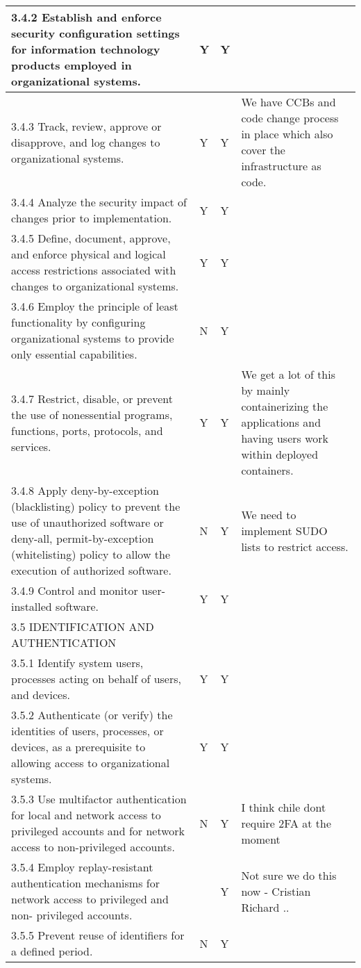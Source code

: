 \begin{longtable} {|p{}|p{}|p{}|p{} |}
{3.4.2 Establish and enforce security configuration settings for information technology products employed in organizational systems.}&{Y}&{Y}& \\ \hline
{3.4.3 Track, review, approve or disapprove, and log changes to organizational systems.}&{Y}&{Y}&{We have CCBs and code change process in place which also cover the infrastructure as code. } \\ \hline
{3.4.4 Analyze the security impact of changes prior to implementation.}&{Y}&{Y}& \\ \hline
{3.4.5 Define, document, approve, and enforce physical and logical access restrictions associated with changes to organizational systems.}&{Y}&{Y}& \\ \hline
{3.4.6 Employ the principle of least functionality by configuring organizational systems to provide only essential capabilities.}&{N}&{Y}& \\ \hline
{3.4.7 Restrict, disable, or prevent the use of nonessential programs, functions, ports, protocols, and services.}&{Y}&{Y}&{We get a lot of this by mainly containerizing the applications and having users work within deployed containers.} \\ \hline
{3.4.8 Apply deny-by-exception (blacklisting) policy to prevent the use of unauthorized software or deny-all, permit-by-exception (whitelisting) policy to allow the execution of authorized software.}&{N}&{Y}&{We need to implement SUDO lists to restrict access.} \\ \hline
{3.4.9 Control and monitor user-installed software.}&{Y}&{Y}& \\ \hline
{3.5 IDENTIFICATION AND AUTHENTICATION}&&& \\ \hline
{3.5.1 Identify system users, processes acting on behalf of users, and devices.}&{Y}&{Y}& \\ \hline
{3.5.2 Authenticate (or verify) the identities of users, processes, or devices, as a prerequisite to allowing access to organizational systems.}&{Y}&{Y}& \\ \hline
{3.5.3 Use multifactor authentication for local and network access to privileged accounts and for network access to non-privileged accounts.}&{N}&{Y}&{ I think chile dont require 2FA at the moment} \\ \hline
{3.5.4 Employ replay-resistant authentication mechanisms for network access to privileged and non- privileged accounts.}&{}&{Y}&{Not sure we do this now - Cristian Richard ..} \\ \hline
{3.5.5 Prevent reuse of identifiers for a defined period.}&{N}&{Y}& \\ \hline

\end{longtable}
